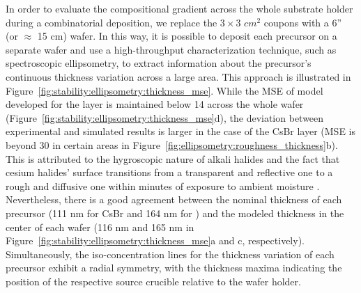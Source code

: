 In order to evaluate the compositional gradient across the whole substrate holder during a combinatorial deposition, we replace the $3\times3$ $cm^2$ coupons with a 6'' (or $\approx$ 15 cm) wafer. In this way, it is possible to deposit each precursor on a separate wafer and use a high-throughput characterization technique, such as spectroscopic ellipsometry, to extract information about the precursor's continuous thickness variation across a large area. This approach is illustrated in Figure~\ref{fig:stability:ellipsometry:thickness_mse}. While the MSE of model developed for the  layer is maintained below 14 across the whole wafer (Figure~\ref{fig:stability:ellipsometry:thickness_mse}d), the deviation between experimental and simulated results is larger in the case of the CsBr layer (MSE is beyond 30 in certain areas in Figure~\ref{fig:ellipsometry:roughness_thickness}b). This is attributed to the hygroscopic nature of alkali halides and the fact that cesium halides' surface transitions from a transparent and reflective one to a rough and diffusive one within minutes of exposure to ambient moisture \cite{Chen2017All-Vacuum-Deposited11}. Nevertheless, there is a good agreement between the nominal thickness of each precursor (111 nm for CsBr and 164 nm for ) and the modeled thickness in the center of each wafer (116 nm and 165 nm in Figure~\ref{fig:stability:ellipsometry:thickness_mse}a and c, respectively). Simultaneously, the iso-concentration lines for the thickness variation of each precursor exhibit a radial symmetry, with the thickness maxima indicating the position of the respective source crucible relative to the wafer holder. 

